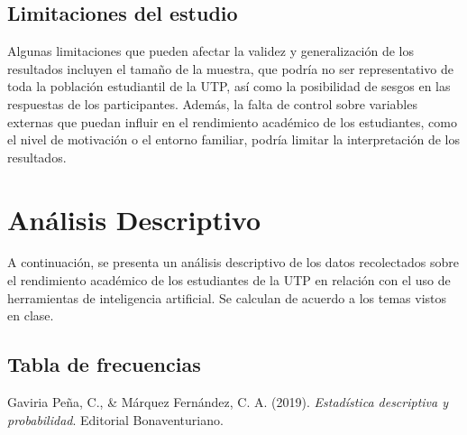 \documentclass{article}
\newenvironment{metodologia}{}{}
\newenvironment{analisisDescriptivo}{}{}
\begin{document}
\begin{metodologia}
  \subsection{Limitaciones del estudio}

  Algunas limitaciones que pueden afectar la validez y generalización de los resultados incluyen el tamaño de la muestra, que podría no ser representativo de toda la población estudiantil de la UTP, así como la posibilidad de sesgos en las respuestas de los participantes. Además, la falta de control sobre variables externas que puedan influir en el rendimiento académico de los estudiantes, como el nivel de motivación o el entorno familiar, podría limitar la interpretación de los resultados.
\end{metodologia}

\newpage

\begin{analisisDescriptivo}

  \section{Análisis Descriptivo}

  A continuación, se presenta un análisis descriptivo de los datos recolectados sobre el rendimiento académico de los estudiantes de la UTP en relación con el uso de herramientas de inteligencia artificial. Se calculan de acuerdo a los temas vistos en clase.

  \subsection{Tabla de frecuencias}
  
\end{analisisDescriptivo}

\newpage

\begin{thebibliography}{9}

  Gaviria Peña, C., \& Márquez Fernández, C. A. (2019). \textit{Estadística descriptiva y probabilidad}. Editorial Bonaventuriano. 

\end{thebibliography}
  
\end{document}
